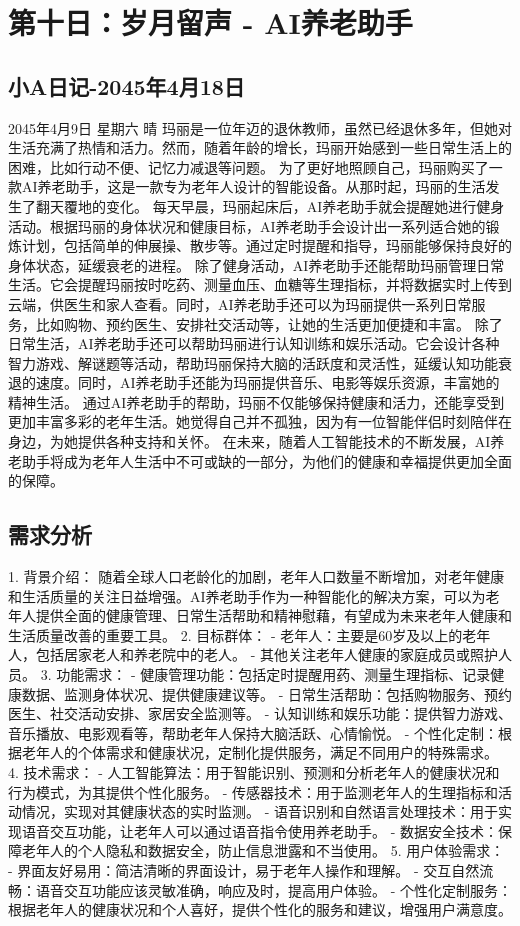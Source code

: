 \section{第十日：岁月留声 - AI养老助手}
\subsection{小A日记-2045年4月18日}
2045年4月9日 星期六 晴
玛丽是一位年迈的退休教师，虽然已经退休多年，但她对生活充满了热情和活力。然而，随着年龄的增长，玛丽开始感到一些日常生活上的困难，比如行动不便、记忆力减退等问题。
为了更好地照顾自己，玛丽购买了一款AI养老助手，这是一款专为老年人设计的智能设备。从那时起，玛丽的生活发生了翻天覆地的变化。
每天早晨，玛丽起床后，AI养老助手就会提醒她进行健身活动。根据玛丽的身体状况和健康目标，AI养老助手会设计出一系列适合她的锻炼计划，包括简单的伸展操、散步等。通过定时提醒和指导，玛丽能够保持良好的身体状态，延缓衰老的进程。
除了健身活动，AI养老助手还能帮助玛丽管理日常生活。它会提醒玛丽按时吃药、测量血压、血糖等生理指标，并将数据实时上传到云端，供医生和家人查看。同时，AI养老助手还可以为玛丽提供一系列日常服务，比如购物、预约医生、安排社交活动等，让她的生活更加便捷和丰富。
除了日常生活，AI养老助手还可以帮助玛丽进行认知训练和娱乐活动。它会设计各种智力游戏、解谜题等活动，帮助玛丽保持大脑的活跃度和灵活性，延缓认知功能衰退的速度。同时，AI养老助手还能为玛丽提供音乐、电影等娱乐资源，丰富她的精神生活。
通过AI养老助手的帮助，玛丽不仅能够保持健康和活力，还能享受到更加丰富多彩的老年生活。她觉得自己并不孤独，因为有一位智能伴侣时刻陪伴在身边，为她提供各种支持和关怀。
在未来，随着人工智能技术的不断发展，AI养老助手将成为老年人生活中不可或缺的一部分，为他们的健康和幸福提供更加全面的保障。
\subsection{需求分析}
1. 背景介绍：
随着全球人口老龄化的加剧，老年人口数量不断增加，对老年健康和生活质量的关注日益增强。AI养老助手作为一种智能化的解决方案，可以为老年人提供全面的健康管理、日常生活帮助和精神慰藉，有望成为未来老年人健康和生活质量改善的重要工具。
2. 目标群体：
- 老年人：主要是60岁及以上的老年人，包括居家老人和养老院中的老人。
- 其他关注老年人健康的家庭成员或照护人员。
3. 功能需求：
- 健康管理功能：包括定时提醒用药、测量生理指标、记录健康数据、监测身体状况、提供健康建议等。
- 日常生活帮助：包括购物服务、预约医生、社交活动安排、家居安全监测等。
- 认知训练和娱乐功能：提供智力游戏、音乐播放、电影观看等，帮助老年人保持大脑活跃、心情愉悦。
- 个性化定制：根据老年人的个体需求和健康状况，定制化提供服务，满足不同用户的特殊需求。
4. 技术需求：
- 人工智能算法：用于智能识别、预测和分析老年人的健康状况和行为模式，为其提供个性化服务。
- 传感器技术：用于监测老年人的生理指标和活动情况，实现对其健康状态的实时监测。
- 语音识别和自然语言处理技术：用于实现语音交互功能，让老年人可以通过语音指令使用养老助手。
- 数据安全技术：保障老年人的个人隐私和数据安全，防止信息泄露和不当使用。
5. 用户体验需求：
- 界面友好易用：简洁清晰的界面设计，易于老年人操作和理解。
- 交互自然流畅：语音交互功能应该灵敏准确，响应及时，提高用户体验。
- 个性化定制服务：根据老年人的健康状况和个人喜好，提供个性化的服务和建议，增强用户满意度。
